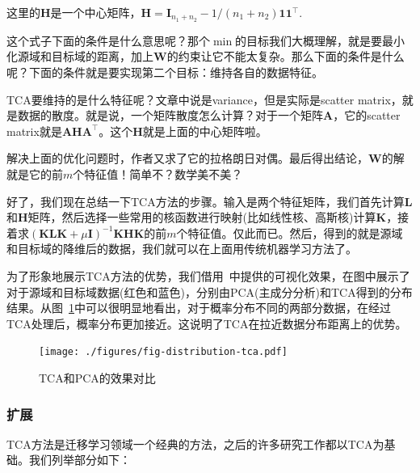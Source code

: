 这里的$\mathbf{H}$是一个中心矩阵，$\mathbf{H} = \mathbf{I}_{n_1 + n_2} - 1/(n_1 + n_2)\mathbf{11}^\top$.

这个式子下面的条件是什么意思呢？那个$\min$的目标我们大概理解，就是要最小化源域和目标域的距离，加上$\mathbf{W}$的约束让它不能太复杂。那么下面的条件是什么呢？下面的条件就是要实现第二个目标：维持各自的数据特征。

TCA要维持的是什么特征呢？文章中说是variance，但是实际是scatter matrix，就是数据的散度。就是说，一个矩阵散度怎么计算？对于一个矩阵$\mathbf{A}$，它的scatter matrix就是$\mathbf{A} \mathbf{H} \mathbf{A}^\top$。这个$\mathbf{H}$就是上面的中心矩阵啦。

解决上面的优化问题时，作者又求了它的拉格朗日对偶。最后得出结论，$\mathbf{W}$的解就是它的前$m$个特征值！简单不？数学美不美？

好了，我们现在总结一下TCA方法的步骤。输入是两个特征矩阵，我们首先计算$\mathbf{L}$和$\mathbf{H}$矩阵，然后选择一些常用的核函数进行映射(比如线性核、高斯核)计算$\mathbf{K}$，接着求$({\mathbf{K}} \mathbf{L} {\mathbf{K}}+\mu \mathbf{I})^{-1}{\mathbf{K}} \mathbf{H}{\mathbf{K}}$的前$m$个特征值。仅此而已。然后，得到的就是源域和目标域的降维后的数据，我们就可以在上面用传统机器学习方法了。

为了形象地展示TCA方法的优势，我们借用~\cite{pan2011domain}中提供的可视化效果，在图中展示了对于源域和目标域数据(红色和蓝色)，分别由PCA(主成分分析)和TCA得到的分布结果。从图~\ref{fig-distribution-tca}中可以很明显地看出，对于概率分布不同的两部分数据，在经过TCA处理后，概率分布更加接近。这说明了TCA在拉近数据分布距离上的优势。

\begin{figure}[htbp]
	\centering
	\texttt{[image: ./figures/fig-distribution-tca.pdf]}
	\caption{TCA和PCA的效果对比}
	\label{fig-distribution-tca}
\end{figure}

\subsubsection{扩展}

TCA方法是迁移学习领域一个经典的方法，之后的许多研究工作都以TCA为基础。我们列举部分如下：

